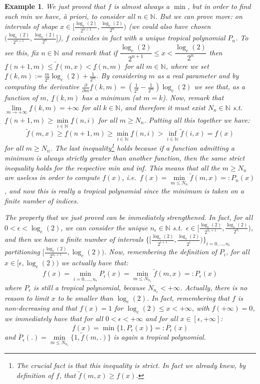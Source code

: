 \documentclass[submission,copyright,creativecommons]{eptcs}
\newtheorem{Example}[theorem]{Example}
\newcommand{\N}{\mathbb{N}}
\newcommand{\set}[1]{\{#1\}}
\begin{document}
\begin{Example}
We just proved that $f$ is almost always a $\min$, but in order to find such min we have, \`a priori, to consider all $n\in\N$.
But we can prove more: on intervals of shape $x\in[\frac{\log_e(2)}{2^{n+1}},\frac{\log_e(2)}{2^{n}})$ (we could also have chosen $(\frac{\log_e(2)}{2^{n+1}},\frac{\log_e(2)}{2^{n}}]$), $f$ coincides in fact with a unique tropical polynomial $P_n$.
To see this, fix $n\in\N$ and remark that if $\dfrac{\log_e(2)}{2^{n+1}}\leq x<\dfrac{\log_e(2)}{2^{n}}$ then $\underline f (n+1,m)\leq \widetilde f(m,x) < \underline f (n,m)$ for all $m\in\N$, where we set $\underline f (k,m):=\frac{m}{2^k}\log_e(2)+\frac{1}{2^{m}}$.
By considering $m$ as a real parameter and by computing the derivative $\frac{\partial}{\partial m}\underline f(k,m)=(\frac{1}{2^k}-\frac{1}{2^m})\log_e(2)$ we see that, as a function of $m$, $\underline f(k,m)$ has a minimum (at $m=k$).
Now, remark that $\lim\limits_{m\to+\infty} \underline f (k,m) = +\infty$ for all $k\in\N$, and therefore it must exist $N_n\in\N$ s.t. $\underline f (n+1,m) \geq \min\limits_{i\in\N} \underline f(n,i)$ for all $m\geq N_n$.
Putting all this together we have:
\[
 \widetilde f(m,x)\geq \underline f(n+1,m)\geq \min\limits_{i\in\N} \underline f(n,i) > \inf\limits_{i\in\N} \widetilde f(i,x) = f(x)
\]
for all $m\geq N_n$.
The last inequality\footnote{The crucial fact is that this inequality is strict. In fact we already knew, by definition of $f$, that $\widetilde f(m,x)\geq f(x)$.} holds because if a function admitting a minimum is always strictly greater than another function, then the same strict inequality holds for the respective min and inf.
This means that all the $m\geq N_n$ are useless in order to compute $f(x)$, i.e.\
$f(x)=\min\limits_{m\leq N_n} \widetilde f(m,x) =:P_n(x)$, and now this is really a tropical polynomial since the minimum is taken on a \emph{finite} number of indices.

The property that we just proved can be immediately strengthened.
In fact, for all $0<\epsilon<\log_e(2)$, we can consider the unique $n_\epsilon\in\N$ s.t.\ $\epsilon \in [\frac{\log_e(2)}{2^{n_\epsilon+1}},\frac{\log_e(2)}{2^{n_\epsilon}})$, and then we have a \emph{finite} number of intervals $\{[\frac{\log_e(2)}{2^{i+1}},\frac{\log_e(2)}{2^{i}})\}_{i=0,\dots,n_\epsilon}$ partitioning $[\frac{\log_e(2)}{2^{n_\epsilon+1}},\log_e(2))$.
Now, remembering the definition of $P_i$, for all $x\in [\epsilon,\log_e(2))$ we actually have that:
\[
 f(x)=\min\limits_{i=0,\dots,n_\epsilon} P_i(x) = \min\limits_{m\leq N_{n_\epsilon}} \widetilde f(m,x) =:P_\epsilon (x)
\]
where $P_\epsilon$ is still a tropical polynomial, because $N_{n_\epsilon}<+\infty$.
Actually, there is no reason to limit $x$ to be smaller than $\log_e(2)$.
In fact, remembering that $f$ is non-decreasing and that $f(x)=1$ for $\log_e(2)\leq x<+\infty$, with $f(+\infty)=0$, we immediately have that for all $0<\epsilon<+\infty$ and for all $x\in [\epsilon,+\infty]$:
\[
 f(x)=\min \set{1,P_\epsilon (x)} =:\overline P_\epsilon (x)
\]
and $\overline P_\epsilon(.)=\min\limits_{m\leq N_{n_\epsilon}} \set{1,\widetilde f(m,.)}$ is again a tropical polynomial.


\end{Example}
\end{document}
